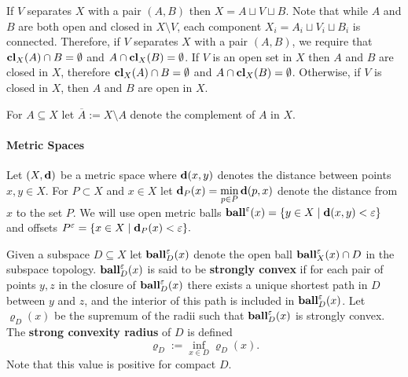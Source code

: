 If $V$ separates $X$ with a pair $(A, B)$ then $X = A\sqcup V\sqcup B$.
Note that while $A$ and $B$ are both open and closed in $X\setminus V$, each component $X_i = A_i\sqcup V_i\sqcup B_i$ is connected.
Therefore, if $V$ separates $X$ with a pair $(A, B)$, we require that $\mathbf{cl}_X(A)\cap B = \emptyset$ and $A\cap \mathbf{cl}_X(B) = \emptyset$.
If $V$ is an open set in $X$ then $A$ and $B$ are closed in $X$, therefore $\mathbf{cl}_X(A)\cap B = \emptyset$ and $A\cap \mathbf{cl}_X(B) = \emptyset$.
Otherwise, if $V$ is closed in $X$, then $A$ and $B$ are open in $X$.

For $A\subseteq X$ let $\overline{A} := X\setminus A$ denote the complement of $A$ in $X$.

\paragraph{Metric Spaces}

Let $(X,\mathbf{d})$ be a metric space where $\mathbf{d}(x, y)$ denotes the distance between points $x,y\in X$.
For $P\subset X$ and $x\in X$ let $\mathbf{d}_P(x) = \displaystyle\min_{p\in P}\mathbf{d}(p, x)$ denote the distance from $x$ to the set $P$.
We will use open metric balls $\mathbf{ball}^\varepsilon(x) = \{y\in X\mid \mathbf{d}(x, y) < \varepsilon\}$ and offsets $P^\varepsilon = \{x\in X\mid \mathbf{d}_P(x) < \varepsilon\}.$

Given a subspace $D\subseteq X$ let $\mathbf{ball}_D^\varepsilon(x)$ denote the open ball $\mathbf{ball}_X^\varepsilon(x)\cap D$ in the subspace topology.
$\mathbf{ball}_D^\varepsilon(x)$ is said to be \textbf{strongly convex} if for each pair of points $y,z$ in the closure of $\mathbf{ball}_D^\varepsilon(x)$ there exists a unique shortest path in $D$ between $y$ and $z$, and the interior of this path is included in $\mathbf{ball}_D^\varepsilon(x)$.
Let $\varrho_D(x)$ be the supremum of the radii such that $\mathbf{ball}_D^\varepsilon(x)$ is strongly convex.
The \textbf{strong convexity radius} of $D$ is defined
\[ \varrho_D := \inf_{x\in D} \varrho_D(x).\]
Note that this value is positive for compact $D$.
